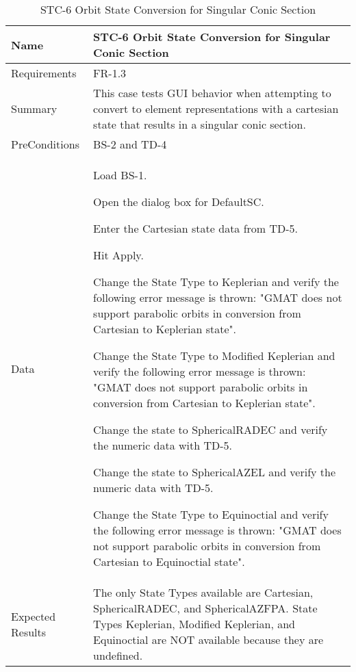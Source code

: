 

\begin{table}[htbp!]
\centering
      \begin{tabular}{|p{1.05 in} |p{4.75 in} |}
      \hline
         \rowcolor[rgb]{0.8,0.8,0.8} Name & STC-6 Orbit State Conversion for Singular Conic Section\\
         \hline
         Requirements & FR-1.3\\  \hline
         Summary &
         This  case tests GUI behavior when attempting to convert to element representations with
         a cartesian state that results in a singular conic section.
         \\     \hline
         PreConditions & BS-2 and TD-4\\     \hline
         Data &
         \begin{compactenum}
             \item Load BS-1.
             \item Open the dialog box for DefaultSC.
             \item Enter the Cartesian state data from TD-5.
             \item Hit Apply.
             \item Change the State Type to Keplerian and verify the following error message is thrown:
             "GMAT does not support parabolic orbits in conversion from Cartesian to Keplerian state".
             \item Change the State Type to Modified Keplerian and verify the following error message is thrown:
             "GMAT does not support parabolic orbits in conversion from Cartesian to Keplerian state".
             \item Change the state to SphericalRADEC and verify the numeric data with TD-5.
             \item Change the state to SphericalAZEL and verify the numeric data with TD-5.
             \item Change the State Type to Equinoctial and verify the following error message is thrown:
             "GMAT does not support parabolic orbits in conversion from Cartesian to Equinoctial state".
         \end{compactenum}
         \\ \hline
         Expected Results & The only State Types available are Cartesian, SphericalRADEC, and SphericalAZFPA.   State Types Keplerian, Modified Keplerian, and Equinoctial are NOT available because they are undefined.\\
      \hline
\end{tabular}
      \label{Table:STC-6}
      \caption{STC-6 Orbit State Conversion for Singular Conic Section}
\end{table} 